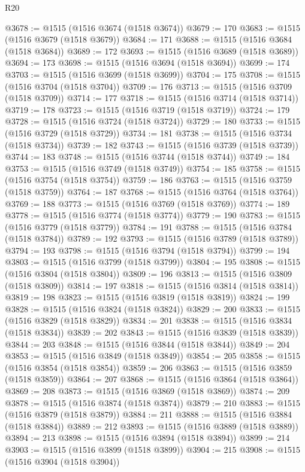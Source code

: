 \begin{lexlean}{R20}
\begin{coremodule}
{@3678 := @1515 (@1516 @3674 (@1518 @3674))
@3679 := 170
@3683 := @1515 (@1516 @3679 (@1518 @3679))
@3684 := 171
@3688 := @1515 (@1516 @3684 (@1518 @3684))
@3689 := 172
@3693 := @1515 (@1516 @3689 (@1518 @3689))
@3694 := 173
@3698 := @1515 (@1516 @3694 (@1518 @3694))
@3699 := 174
@3703 := @1515 (@1516 @3699 (@1518 @3699))
@3704 := 175
@3708 := @1515 (@1516 @3704 (@1518 @3704))
@3709 := 176
@3713 := @1515 (@1516 @3709 (@1518 @3709))
@3714 := 177
@3718 := @1515 (@1516 @3714 (@1518 @3714))
@3719 := 178
@3723 := @1515 (@1516 @3719 (@1518 @3719))
@3724 := 179
@3728 := @1515 (@1516 @3724 (@1518 @3724))
@3729 := 180
@3733 := @1515 (@1516 @3729 (@1518 @3729))
@3734 := 181
@3738 := @1515 (@1516 @3734 (@1518 @3734))
@3739 := 182
@3743 := @1515 (@1516 @3739 (@1518 @3739))
@3744 := 183
@3748 := @1515 (@1516 @3744 (@1518 @3744))
@3749 := 184
@3753 := @1515 (@1516 @3749 (@1518 @3749))
@3754 := 185
@3758 := @1515 (@1516 @3754 (@1518 @3754))
@3759 := 186
@3763 := @1515 (@1516 @3759 (@1518 @3759))
@3764 := 187
@3768 := @1515 (@1516 @3764 (@1518 @3764))
@3769 := 188
@3773 := @1515 (@1516 @3769 (@1518 @3769))
@3774 := 189
@3778 := @1515 (@1516 @3774 (@1518 @3774))
@3779 := 190
@3783 := @1515 (@1516 @3779 (@1518 @3779))
@3784 := 191
@3788 := @1515 (@1516 @3784 (@1518 @3784))
@3789 := 192
@3793 := @1515 (@1516 @3789 (@1518 @3789))
@3794 := 193
@3798 := @1515 (@1516 @3794 (@1518 @3794))
@3799 := 194
@3803 := @1515 (@1516 @3799 (@1518 @3799))
@3804 := 195
@3808 := @1515 (@1516 @3804 (@1518 @3804))
@3809 := 196
@3813 := @1515 (@1516 @3809 (@1518 @3809))
@3814 := 197
@3818 := @1515 (@1516 @3814 (@1518 @3814))
@3819 := 198
@3823 := @1515 (@1516 @3819 (@1518 @3819))
@3824 := 199
@3828 := @1515 (@1516 @3824 (@1518 @3824))
@3829 := 200
@3833 := @1515 (@1516 @3829 (@1518 @3829))
@3834 := 201
@3838 := @1515 (@1516 @3834 (@1518 @3834))
@3839 := 202
@3843 := @1515 (@1516 @3839 (@1518 @3839))
@3844 := 203
@3848 := @1515 (@1516 @3844 (@1518 @3844))
@3849 := 204
@3853 := @1515 (@1516 @3849 (@1518 @3849))
@3854 := 205
@3858 := @1515 (@1516 @3854 (@1518 @3854))
@3859 := 206
@3863 := @1515 (@1516 @3859 (@1518 @3859))
@3864 := 207
@3868 := @1515 (@1516 @3864 (@1518 @3864))
@3869 := 208
@3873 := @1515 (@1516 @3869 (@1518 @3869))
@3874 := 209
@3878 := @1515 (@1516 @3874 (@1518 @3874))
@3879 := 210
@3883 := @1515 (@1516 @3879 (@1518 @3879))
@3884 := 211
@3888 := @1515 (@1516 @3884 (@1518 @3884))
@3889 := 212
@3893 := @1515 (@1516 @3889 (@1518 @3889))
@3894 := 213
@3898 := @1515 (@1516 @3894 (@1518 @3894))
@3899 := 214
@3903 := @1515 (@1516 @3899 (@1518 @3899))
@3904 := 215
@3908 := @1515 (@1516 @3904 (@1518 @3904))
}
\end{coremodule}
\end{lexlean}
